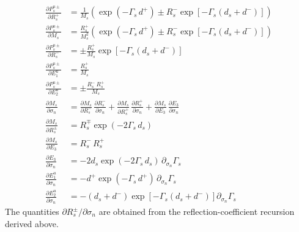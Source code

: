 \documentclass[12pt]{report}
\newcommand{\pds}[1]{\partial_{\sigma_{#1}}}   %
\begin{document}
\begin{align}
    \frac{\partial P_s^{u\pm}}{\partial R_s^+}
    &= \frac{1}{M_s}
       \left(\exp(-\Gamma_s\,d^+) \pm R_s^-\exp\!\left[-\Gamma_s(d_s+d^-)\right]\right)
    \label{eq:1.52} \\
    \frac{\partial P_s^{u\pm}}{\partial M_s}
    &= \frac{R_s^+}{M_s^2}
       \left(\exp(-\Gamma_s\,d^+) \pm R_s^-\exp\!\left[-\Gamma_s(d_s+d^-)\right]\right)
    \label{eq:1.53} \\
    \frac{\partial P_s^{u\pm}}{\partial R_s^-}
    &= \pm\frac{R_s^+}{M_s}\exp\!\left[-\Gamma_s(d_s+d^-)\right]
    \label{eq:1.54} \\
    \frac{\partial P_s^{u\pm}}{\partial E_1^u}
    &= \frac{R_s^+}{M_s}
    \label{eq:1.55} \\
    \frac{\partial P_s^{u\pm}}{\partial E_2^u}
    &= \pm\frac{R_s^-\,R_s^+}{M_s}
    \label{eq:1.56} \\
    \frac{\partial M_s}{\partial \sigma_n}
    &= \frac{\partial M_s}{\partial R_s^-}\,\frac{\partial R_s^-}{\partial \sigma_n}
     + \frac{\partial M_s}{\partial R_s^+}\,\frac{\partial R_s^+}{\partial \sigma_n}
     + \frac{\partial M_s}{\partial E_3}\,\frac{\partial E_3}{\partial \sigma_n}
    \label{eq:1.57} \\
    \frac{\partial M_s}{\partial R_s^\pm}
    &= R_s^\mp\exp(-2\Gamma_s\,d_s)
    \label{eq:1.58} \\
    \frac{\partial M_s}{\partial E_3}
    &= R_s^-\,R_s^+
    \label{eq:1.59} \\
    \frac{\partial E_3}{\partial \sigma_n}
    &= -2d_s\exp(-2\Gamma_s\,d_s)\,\pds{n}\Gamma_s
    \label{eq:1.60} \\
    \frac{\partial E_1^u}{\partial \sigma_n}
    &= -d^+\exp(-\Gamma_s\,d^+)\,\pds{n}\Gamma_s
    \label{eq:1.61} \\
    \frac{\partial E_2^u}{\partial \sigma_n}
    &= -(d_s+d^-)\exp\!\left[-\Gamma_s(d_s+d^-)\right]\pds{n}\Gamma_s
    \label{eq:1.62}
\end{align}
The quantities \(\partial R_s^\pm/\partial\sigma_n\) are obtained from
the reflection-coefficient recursion derived above.
\end{document}
